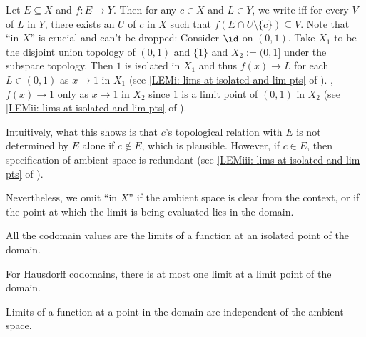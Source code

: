 	Let $E\subseteq X$ and $f\colon E\to Y$. Then for any $c\in X$ and $L\in Y$, we write  iff for every \onbd $V$ of $L$ in $Y$, there exists an \onbd $U$ of $c$ in $X$ such that $f(E\cap U\setminus\{c\})\subseteq V$. Note that ``in $X$'' is crucial and can't be dropped: Consider $\id$ on $(0, 1)$. Take $X_1$ to be the disjoint union topology of $(0, 1)$ and $\{1\}$ and $X_2 := (0, 1]$ under the subspace topology. Then $1$ is isolated in $X_1$ and thus $f(x)\to L$ for each $L\in (0, 1)$ as $x\to 1$ in $X_1$ (see \ref{LEMi: lims at isolated and lim pts} of ). \Otoh, $f(x)\to 1$ only as $x\to 1$ in $X_2$ since $1$ is a limit point of $(0, 1)$ in $X_2$ (see \ref{LEMii: lims at isolated and lim pts} of ).
	
	Intuitively, what this shows is that $c$'s topological relation with $E$ is not determined by $E$ alone if $c\notin E$, which is plausible. However, if $c\in E$, then specification of ambient space is redundant (see \ref{LEMiii: lims at isolated and lim pts} of ).
	
	Nevertheless, we omit ``in $X$'' if the ambient space is clear from the context, or if the point at which the limit is being evaluated lies in the domain.
	
	\begin{lem}\label{LEM: lims at isolated and lim pts}
		\begin{mylist}
			\item\label{LEMi: lims at isolated and lim pts} All the codomain values are the limits of a function at an isolated point of the domain.
			
			\item\label{LEMii: lims at isolated and lim pts} For Hausdorff codomains, there is at most one limit at a limit point of the domain.
			
			\item\label{LEMiii: lims at isolated and lim pts} Limits of a function at a point in the domain are independent of the ambient space.
		\end{mylist}
	\end{lem}
	
